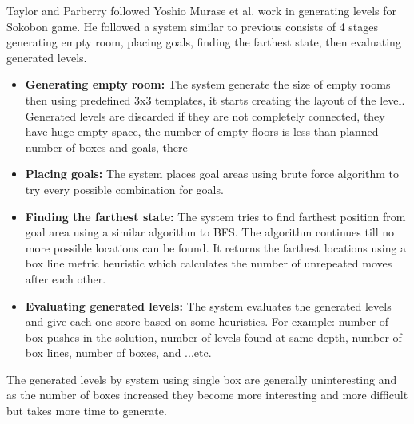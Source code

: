 Taylor and Parberry\cite{sokobanLevelGenerationNew} followed Yoshio Murase et al.\cite{sokobanLevelGenerationOld} work in generating levels for Sokobon game. He followed a system similar to previous consists of 4 stages generating empty room, placing goals, finding the farthest state, then evaluating generated levels.
\begin{itemize} \itemsep0pt \parskip0pt 
	\item \textbf{Generating empty room:} The system generate the size of empty rooms then using predefined 3x3 templates, it starts creating the layout of the level. Generated levels are discarded if they are not completely connected, they have huge empty space, the number of empty floors is less than planned number of boxes and goals, there
	\item \textbf{Placing goals:} The system places goal areas using brute force algorithm to try every possible combination for goals.
	\item \textbf{Finding the farthest state:} The system tries to find farthest position from goal area using a similar algorithm to BFS. The algorithm continues till no more possible locations  can be found. It returns the farthest locations using a box line metric heuristic which calculates the number of unrepeated moves after each other.
	\item \textbf{Evaluating generated levels:} The system evaluates the generated levels and give each one score based on some heuristics. For example: number of box pushes in the solution, number of levels found at same depth, number of box lines, number of boxes, and ...etc.  
\end{itemize}
The generated levels by system using single box are generally uninteresting and as the number of boxes increased they become more interesting and more difficult but takes more time to generate.


